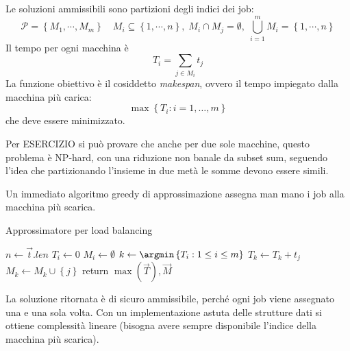 Le soluzioni ammissibili sono partizioni degli indici dei job: 
\begin{equation*}
    \mathcal{P} = 
    \left\{ 
        M_1, \cdots, M_m
    \right\}
    \quad
    M_i \subseteq \left\{ 1, \cdots, n \right\}
    , \;
    M_i \cap M_j = \emptyset
    , \;
    \bigcup_{i = 1}^{m} M_i
    = \left\{ 1, \cdots, n \right\}
\end{equation*}
Il tempo per ogni macchina è
\begin{equation*}
    T_i = 
    \sum_{j \in M_i} t_j
\end{equation*}
La funzione obiettivo è il cosiddetto \emph{makespan}, ovvero il tempo impiegato dalla macchina più carica:
\begin{equation*}
    \max
    \left\{ 
        T_i : i=1, \ldots, m
    \right\}
\end{equation*}
che deve essere minimizzato.

Per ESERCIZIO si può provare che anche per due sole macchine, questo problema è NP-hard, con una riduzione non banale da subset sum, seguendo l'idea che partizionando l'insieme in due metà le somme devono essere simili.

Un immediato algoritmo greedy di approssimazione assegna man mano i job alla macchina più scarica.
\begin{algorithm}[H]
\caption{Approssimatore per load balancing}\label{alg:lb_approx}
\begin{algorithmic}[1]
        \State $n \gets \vec{t}.len$
            \State $T_i \gets 0$
            \State $M_i \gets \emptyset$
        \EndFor
            \State $k \gets \argmin \left\{ T_i : 1 \leq i \leq m \right\}$
            \State $T_k \gets T_k + t_j$
            \State $M_k \gets M_k \cup \left\{ j \right\}$
        \EndFor
        \State return $\max ( \vec{T} ), \vec{M}$
    \EndProcedure
\end{algorithmic}
\end{algorithm}
La soluzione ritornata è di sicuro ammissibile, perché ogni job viene assegnato una e una sola volta. Con un implementazione astuta delle strutture dati si ottiene complessità lineare (bisogna avere sempre disponibile l'indice della macchina più scarica).

